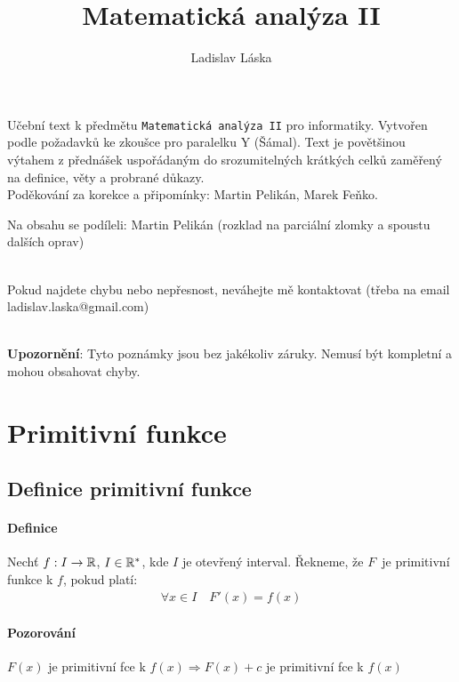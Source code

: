 \documentclass[a4paper,10pt]{article}
\title{Matematická analýza II}
\author{Ladislav Láska}
\begin{document}
\maketitle
Učební text k předmětu \texttt{Matematická analýza II} pro informatiky. Vytvořen podle
požadavků ke zkoušce pro paralelku Y (Šámal). Text je povětšinou výtahem z
přednášek uspořádaným do srozumitelných krátkých celků zaměřený na definice,
věty a probrané důkazy.\\

Poděkování za korekce a připomínky: Martin Pelikán, Marek Feňko.

Na obsahu se podíleli: Martin Pelikán (rozklad na parciální zlomky a spoustu
dalších oprav)

\ \\

Pokud najdete chybu nebo nepřesnost, neváhejte mě kontaktovat (třeba na email
ladislav.laska@gmail.com)

\ \\

\textbf{Upozornění}: Tyto poznámky jsou bez jakékoliv záruky. Nemusí být kompletní a mohou
obsahovat chyby.
\newpage
\newpage


\tableofcontents
\newpage

\section{Primitivní funkce}
\subsection{Definice primitivní funkce}
\setcounter{equation}{0}
\paragraph{Definice} Nechť $f: I \to \mathbb{R}$, $I \in \mathbb{R}^*$, kde $I$ je otevřený interval. 
Řekneme, že $F$~je primitivní funkce k $f$, pokud platí:
\begin{align*}
	\forall x \in I \quad F'(x) = f(x)
\end{align*}
\paragraph{Pozorování} $F(x)$ je primitivní fce k $f(x) \Rightarrow F(x) + c$ je primitivní fce k $f(x)$
\end{document}
